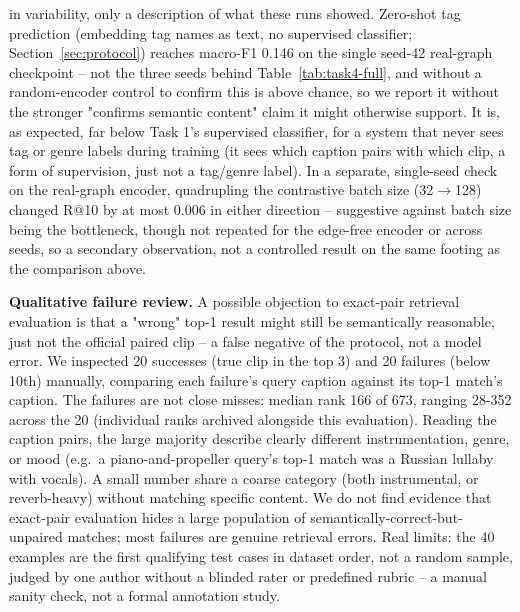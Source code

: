 in variability, only a description of what these runs showed.
Zero-shot tag prediction (embedding tag names as text, no supervised classifier;
Section~\ref{sec:protocol}) reaches macro-F1 0.146 on the single seed-42 real-graph
checkpoint -- not the three seeds behind Table~\ref{tab:task4-full}, and without a
random-encoder control to confirm this is above chance, so we report it without the stronger
"confirms semantic content" claim it might otherwise support. It is, as expected, far below
Task 1's supervised classifier, for a system that never sees tag or genre labels during
training (it sees which caption pairs with which clip, a form of supervision, just not a
tag/genre label). In a separate, single-seed check on the real-graph encoder, quadrupling the
contrastive batch size (32$\to$128) changed R@10 by at most 0.006 in either direction --
suggestive against batch size being the bottleneck, though not repeated for the edge-free
encoder or across seeds, so a secondary observation, not a controlled result on the same
footing as the comparison above.

\textbf{Qualitative failure review.} A possible objection to exact-pair retrieval evaluation
is that a "wrong" top-1 result might still be semantically reasonable, just not the official
paired clip -- a false negative of the protocol, not a model error. We inspected 20
successes (true clip in the top 3) and 20 failures (below 10th) manually, comparing each
failure's query caption against its top-1 match's caption. The failures are not close
misses: median rank 166 of 673, ranging 28-352 across the 20 (individual ranks archived
alongside this evaluation). Reading the caption pairs, the large majority describe clearly
different instrumentation, genre, or mood (e.g.\ a piano-and-propeller query's top-1 match
was a Russian lullaby with vocals). A small number share a coarse category (both
instrumental, or reverb-heavy) without matching specific content. We do not find evidence
that exact-pair evaluation hides a large population of semantically-correct-but-unpaired
matches; most failures are genuine retrieval errors. Real limits: the 40 examples are the
first qualifying test cases in dataset order, not a random sample, judged by one author
without a blinded rater or predefined rubric -- a manual sanity check, not a formal
annotation study.
